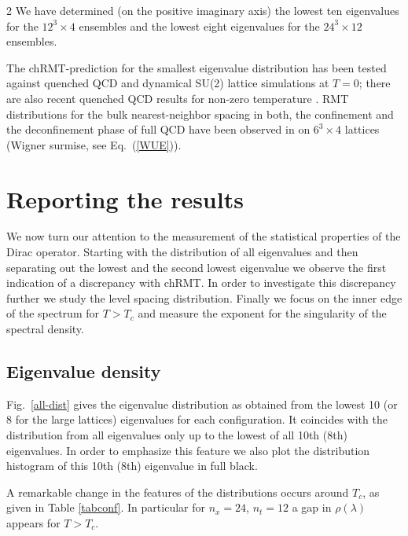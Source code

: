 \begin{multicols}{2}
We have determined (on the positive imaginary axis)  the lowest ten eigenvalues
for the $12^3\times 4$ ensembles  and the lowest eight eigenvalues for the
$24^3\times 12$ ensembles.

The  chRMT-prediction for the smallest eigenvalue distribution has been tested 
against quenched QCD \cite{DaHeKr99,EdHeKi99} and dynamical SU(2) 
\cite{BeMeWe98} lattice simulations at $T=0$; there are also recent quenched
QCD results for non-zero temperature \cite{EdHeKi99a}.  RMT distributions for
the bulk nearest-neighbor spacing in both, the confinement and the
deconfinement phase of full QCD have been observed in \cite{PuRaWe98}  on
$6^3\times 4$ lattices  (Wigner surmise, see Eq.~(\ref{WUE})). 



\section{Reporting the results } 

We now turn our attention to the measurement of the statistical properties of 
the Dirac operator. Starting with the distribution of all eigenvalues and  then
separating out the lowest and the second lowest eigenvalue we observe the first
indication of a discrepancy with chRMT. In order to investigate this
discrepancy further we study the level spacing distribution. Finally we focus
on the inner edge of the spectrum for $T>T_c$ and measure the exponent for the
singularity of the spectral density.

\subsection{Eigenvalue density}

Fig.~\ref{all-dist} gives the eigenvalue distribution as obtained from the
lowest 10 (or 8 for the large lattices) eigenvalues for each configuration. It 
coincides with the distribution from all eigenvalues only up to the lowest of
all 10th (8th) eigenvalues. In order to emphasize this feature we also plot the
distribution histogram of this 10th (8th) eigenvalue in full black.

A remarkable change in the features of the  distributions occurs around $T_c$,
as given in Table \ref{tabconf}. In particular for $n_x=24$, $n_t=12$ a gap in
$\rho(\lambda)$ appears for $T>T_c$. 


\end{multicols}
